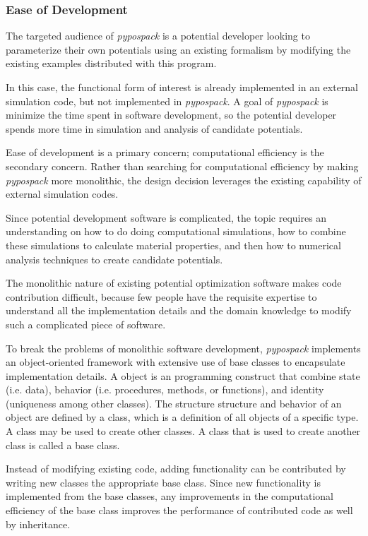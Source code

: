\subsubsection{Ease of Development}

The targeted audience of \emph{pypospack} is a potential developer looking to parameterize their own potentials using an existing formalism by modifying the existing examples distributed with this program.

In this case, the functional form of interest is already implemented in an external simulation code, but not implemented in \emph{pypospack}.  A goal of \emph{pypospack} is minimize the time spent in software development, so the potential developer spends more time in simulation and analysis of candidate potentials.

Ease of development is a primary concern; computational efficiency is the secondary concern.  Rather than searching for computational efficiency by making \emph{pypospack} more monolithic, the design decision leverages the existing capability of external simulation codes.

Since potential development software is complicated, the topic requires an understanding on how to do doing computational simulations, how to combine these simulations to calculate material properties, and then how to numerical analysis techniques to create candidate potentials.

The monolithic nature of existing potential optimization software makes code contribution difficult, because few people have the requisite expertise to understand all the implementation details and the domain knowledge to modify such a complicated piece of software.

To break the problems of monolithic software development, \emph{pypospack} implements an object-oriented framework with extensive use of base classes to encapsulate implementation details.  A object is an programming construct that combine state (i.e. data), behavior (i.e. procedures, methods, or functions), and identity (uniqueness among other classes).  The structure structure and behavior of an object are defined by a class, which is a definition of all objects of a specific type.  A class may be used to create other classes.  A class that is used to create another class is called a base class.

Instead of modifying existing code, adding functionality can be contributed by writing new classes the appropriate base class.  Since new functionality is implemented from the base classes, any improvements in the computational efficiency of the base class improves the performance of contributed code as well by inheritance.

